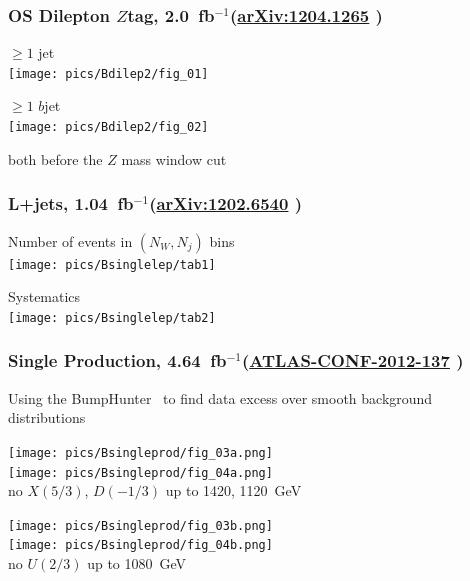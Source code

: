 \documentclass[xcolor=dvipsnames,10pt]{beamer}
\newcommand{\ifb}{~fb$^{-1}$}
\begin{document}
\begin{frame}[label=Bdilep2]\frametitle{OS Dilepton $Z$tag, 2.0\ifb ({\small \href{http://arxiv.org/abs/1204.1265}{arXiv:1204.1265} \cite{:2012aka}})}
\footnotesize\centering


\begin{minipage}{.5\textwidth}
\centering
$\geq 1 $ jet\\
\texttt{[image: pics/Bdilep2/fig\_01]}
\end{minipage}\begin{minipage}{.5\textwidth}
\centering
$\geq 1$ $b$jet\\
\texttt{[image: pics/Bdilep2/fig\_02]}
\end{minipage}

both before the $Z$ mass window cut

\end{frame}


\begin{frame}[label=Bsinglelep]\frametitle{L+jets, 1.04\ifb ({\small \href{http://arxiv.org/abs/1202.6540}{arXiv:1202.6540} \cite{ATLAS:2012aw}})}
\footnotesize\centering

\begin{minipage}{.5\textwidth}
Number of events in $(N_W, N_j)$ bins\\
\texttt{[image: pics/Bsinglelep/tab1]}
\end{minipage}\begin{minipage}{.5\textwidth}
Systematics\\
\texttt{[image: pics/Bsinglelep/tab2]}
\end{minipage}

\end{frame}


\begin{frame}[label=Bsingleprod]\frametitle{Single Production, 4.64\ifb ({\small \href{http://cdsweb.cern.ch/record/1480628}{ATLAS-CONF-2012-137} \cite{ATLAS-CONF-2012-137}})}
\footnotesize\centering


Using the BumpHunter~\cite{2011arXiv1101.0390C} to find data excess over smooth background distributions\\

\begin{minipage}{.5\textwidth}\scriptsize\centering
\texttt{[image: pics/Bsingleprod/fig\_03a.png]}\\
\texttt{[image: pics/Bsingleprod/fig\_04a.png]}\\
no $X(5/3)$, $D(-1/3)$ up to \alert{1420, 1120~GeV}
\end{minipage}\begin{minipage}{.5\textwidth}\scriptsize\centering
\texttt{[image: pics/Bsingleprod/fig\_03b.png]}\\
\texttt{[image: pics/Bsingleprod/fig\_04b.png]}\\
no $U(2/3)$ up to \alert{1080~GeV}
\end{minipage}


\end{frame}
\end{document}
